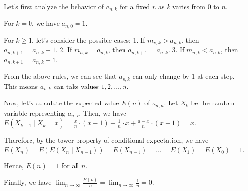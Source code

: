 Let's first analyze the behavior of $a_{n,k}$ for a fixed $n$ as $k$ varies from $0$ to $n$. 

For $k=0$, we have $a_{n,0}=1$.

For $k\geq 1$, let's consider the possible cases:
1. If $m_{n,k} > a_{n,k}$, then $a_{n,k+1} = a_{n,k} + 1$.
2. If $m_{n,k} = a_{n,k}$, then $a_{n,k+1} = a_{n,k}$.
3. If $m_{n,k} < a_{n,k}$, then $a_{n,k+1} = a_{n,k} - 1$.

From the above rules, we can see that $a_{n,k}$ can only change by $1$ at each step. This means $a_{n,k}$ can take values $1, 2, \ldots, n$.

Now, let's calculate the expected value $E(n)$ of $a_{n,n}$:
Let $X_k$ be the random variable representing $a_{n,k}$.
Then, we have $E(X_{k+1} \mid X_k = x) = \frac{x}{n} \cdot (x-1) + \frac{1}{n} \cdot x + \frac{n-x}{n} \cdot (x+1) = x$.

Therefore, by the tower property of conditional expectation, we have $E(X_n) = E(E(X_n \mid X_{n-1})) = E(X_{n-1}) = \ldots = E(X_1) = E(X_0) = 1$.

Hence, $E(n) = 1$ for all $n$.

Finally, we have $\lim_{n\to \infty} \frac{E(n)}{n} = \lim_{n\to \infty} \frac{1}{n} = 0$.
